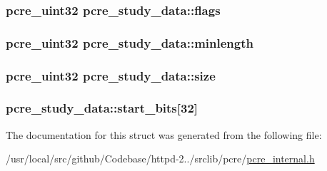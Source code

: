 \subsubsection[{\texorpdfstring{flags}{flags}}]{\setlength{\rightskip}{0pt plus 5cm}pcre\+\_\+uint32 pcre\+\_\+study\+\_\+data\+::flags}\hypertarget{structpcre__study__data_aa7f0cd71352343074202364478c25a4d}{}\label{structpcre__study__data_aa7f0cd71352343074202364478c25a4d}
\subsubsection[{\texorpdfstring{minlength}{minlength}}]{\setlength{\rightskip}{0pt plus 5cm}pcre\+\_\+uint32 pcre\+\_\+study\+\_\+data\+::minlength}\hypertarget{structpcre__study__data_a50cb4fc8a227db9bfe3568764aca3274}{}\label{structpcre__study__data_a50cb4fc8a227db9bfe3568764aca3274}
\subsubsection[{\texorpdfstring{size}{size}}]{\setlength{\rightskip}{0pt plus 5cm}pcre\+\_\+uint32 pcre\+\_\+study\+\_\+data\+::size}\hypertarget{structpcre__study__data_ac994347d3d729eaf14eba590b65867a6}{}\label{structpcre__study__data_ac994347d3d729eaf14eba590b65867a6}
\subsubsection[{\texorpdfstring{start\+\_\+bits}{start_bits}}]{ pcre\+\_\+study\+\_\+data\+::start\+\_\+bits\mbox{[}32\mbox{]}}\hypertarget{structpcre__study__data_ab4dd0613033fa41c5cd084a98b4c0fb0}{}\label{structpcre__study__data_ab4dd0613033fa41c5cd084a98b4c0fb0}


The documentation for this struct was generated from the following file\+:\begin{DoxyCompactItemize}
\item 
/usr/local/src/github/\+Codebase/httpd-\/2../srclib/pcre/\hyperlink{pcre__internal_8h}{pcre\+\_\+internal.\+h}\end{DoxyCompactItemize}
